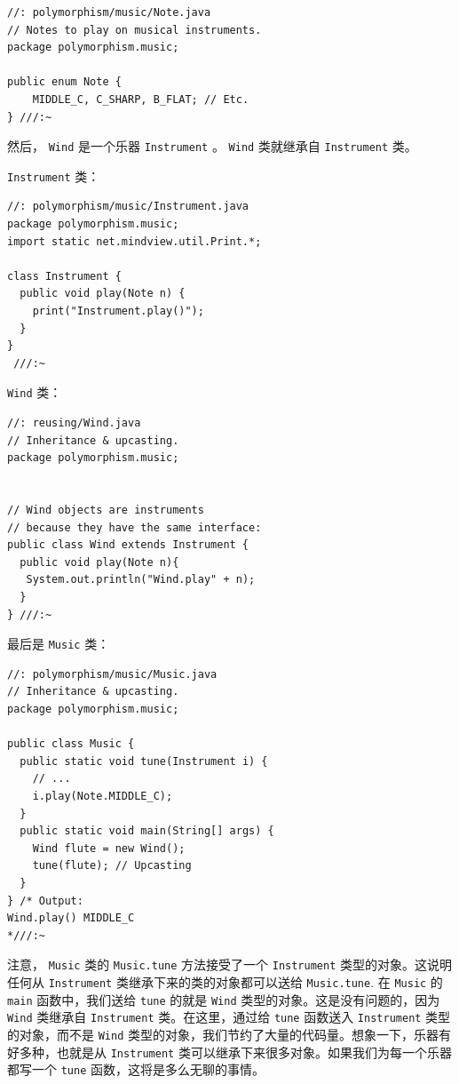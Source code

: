 \documentclass[10pt,a4paper,UTF8]{article}
\begin{document}
\lstset{language=C,label= ,caption= ,captionpos=b,firstnumber=1,numbers=left}
\begin{lstlisting}
//: polymorphism/music/Note.java
// Notes to play on musical instruments.
package polymorphism.music;

public enum Note {
    MIDDLE_C, C_SHARP, B_FLAT; // Etc.
} ///:~
\end{lstlisting}

然后， \texttt{Wind} 是一个乐器 \texttt{Instrument} 。 \texttt{Wind} 类就继承自 \texttt{Instrument} 类。

\texttt{Instrument} 类：
\lstset{language=C,label= ,caption= ,captionpos=b,firstnumber=1,numbers=left}
\begin{lstlisting}
//: polymorphism/music/Instrument.java
package polymorphism.music;
import static net.mindview.util.Print.*;

class Instrument {
  public void play(Note n) {
    print("Instrument.play()");
  }
}
 ///:~
\end{lstlisting}
\texttt{Wind} 类：
\lstset{language=C,label= ,caption= ,captionpos=b,firstnumber=1,numbers=left}
\begin{lstlisting}
//: reusing/Wind.java
// Inheritance & upcasting.
package polymorphism.music;


// Wind objects are instruments
// because they have the same interface:
public class Wind extends Instrument {
  public void play(Note n){
   System.out.println("Wind.play" + n);
  }
} ///:~
\end{lstlisting}
最后是 \texttt{Music} 类：
\lstset{language=C,label= ,caption= ,captionpos=b,firstnumber=1,numbers=left}
\begin{lstlisting}
//: polymorphism/music/Music.java
// Inheritance & upcasting.
package polymorphism.music;

public class Music {
  public static void tune(Instrument i) {
    // ...
    i.play(Note.MIDDLE_C);
  }
  public static void main(String[] args) {
    Wind flute = new Wind();
    tune(flute); // Upcasting
  }
} /* Output:
Wind.play() MIDDLE_C
*///:~
\end{lstlisting}
注意， \texttt{Music} 类的 \texttt{Music.tune}  方法接受了一个 \texttt{Instrument} 类型的对象。这说明任何从 \texttt{Instrument} 类继承下来的类的对象都可以送给 \texttt{Music.tune}. 在 \texttt{Music} 的 \texttt{main} 函数中，我们送给 \texttt{tune} 的就是 \texttt{Wind} 类型的对象。这是没有问题的，因为 \texttt{Wind} 类继承自 \texttt{Instrument} 类。在这里，通过给 \texttt{tune} 函数送入 \texttt{Instrument} 类型的对象，而不是 \texttt{Wind} 类型的对象，我们节约了大量的代码量。想象一下，乐器有好多种，也就是从 \texttt{Instrument} 类可以继承下来很多对象。如果我们为每一个乐器都写一个 \texttt{tune} 函数，这将是多么无聊的事情。
\end{document}
